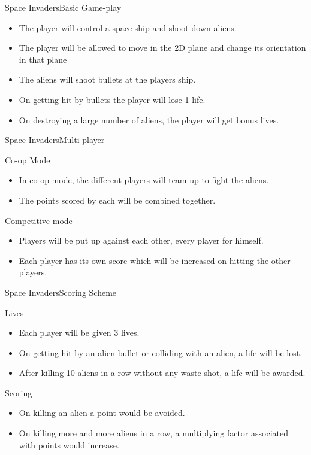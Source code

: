 \documentclass{beamer}
\begin{document}
\begin{frame}{Space Invaders}{Basic Game-play}
  \begin{itemize}
  	\item The player will control a space ship and shoot down aliens.
  	\item The player will be allowed to move in the 2D plane and change its orientation in that plane 
  	\item The aliens will shoot bullets at the players ship.
  	\item On getting hit by bullets the player will lose 1 life.
  	\item On destroying a large number of aliens, the player will get bonus lives.
  \end{itemize}
\end{frame}

\begin{frame}{Space Invaders}{Multi-player}
	\begin{block}{Co-op Mode}
	\begin{itemize}
		\item In co-op mode, the different players will team up to fight the aliens.
		\item The points scored by each will be combined together.
	\end{itemize}
	\end{block}
	\begin{block}{Competitive mode}
	\begin{itemize}
		\item Players will be put up against each other, every player for himself. 
		\item Each player has its own score which will be increased on hitting the other players.
	\end{itemize}  
	\end{block}
\end{frame}

\begin{frame}{Space Invaders}{Scoring Scheme}
	\begin{block}{Lives}
		\begin{itemize}
			\item Each player will be given 3 lives.
			\item On getting hit by an alien bullet or colliding with an alien, a life will be lost.
			\item After killing 10 aliens in a row without any waste shot, a life will be awarded.
		\end{itemize}
	\end{block}
	
	\begin{block}{Scoring}
		\begin{itemize}
			\item On killing an alien a point would be avoided.
			\item On killing more and more aliens in a row, a multiplying factor associated with points would increase.
		\end{itemize}
	\end{block}
\end{frame}
\end{document}
